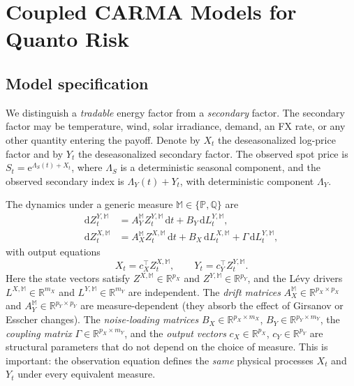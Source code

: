 \documentclass[10pt,a4paper,reqno]{amsart}
\newcommand{\R}{\mathbb{R}}
\newcommand{\Q}{\mathbb{Q}}
\newcommand{\PP}{\mathbb{P}}
\newcommand{\1}{\mathbbm{1}}
\newcommand{\dd}{\mathrm{d}}
\newcommand{\ee}{\mathrm{e}}
\begin{document}
\section{Coupled CARMA Models for Quanto Risk}\label{sec:coupled-carma-models}

\subsection{Model specification}

We distinguish a \emph{tradable} energy factor from a \emph{secondary} factor.
The secondary factor may be temperature, wind, solar irradiance, demand, an FX
rate, or any other quantity entering the payoff. Denote by \(X_t\) the
deseasonalized log-price factor and by \(Y_t\) the deseasonalized secondary
factor. The observed spot price is \(S_t = \ee^{\Lambda_S(t)+X_t}\), where
\(\Lambda_S\) is a deterministic seasonal component, and the observed secondary
index is \(\Lambda_Y(t)+Y_t\), with deterministic component \(\Lambda_Y\).

The dynamics under a generic measure \(\mathbb{M} \in \{\PP,\Q\}\) are
\begin{equation}\label{eq:coupled_model}
\begin{aligned}
  \dd Z_t^{Y,\mathbb{M}}
    &= A_Y^{\mathbb{M}} Z_t^{Y,\mathbb{M}}\,\dd t
       + B_Y\,\dd L_t^{Y,\mathbb{M}},\\
  \dd Z_t^{X,\mathbb{M}}
    &= A_X^{\mathbb{M}} Z_t^{X,\mathbb{M}}\,\dd t
       + B_X\,\dd L_t^{X,\mathbb{M}}
       + \Gamma\,\dd L_t^{Y,\mathbb{M}},
\end{aligned}
\end{equation}
with output equations
\begin{equation}\label{eq:outputs_coupled}
  X_t = c_X^\top Z_t^{X,\mathbb{M}},
  \qquad
  Y_t = c_Y^\top Z_t^{Y,\mathbb{M}}.
\end{equation}
Here the state vectors satisfy \(Z^{X,\mathbb{M}} \in \R^{p_X}\) and
\(Z^{Y,\mathbb{M}} \in \R^{p_Y}\), and the Lévy drivers \(L^{X,\mathbb{M}} \in
\R^{m_X}\) and \(L^{Y,\mathbb{M}} \in \R^{m_Y}\) are independent.
The \emph{drift matrices} \(A_X^{\mathbb{M}} \in \R^{p_X \times p_X}\) and
\(A_Y^{\mathbb{M}} \in \R^{p_Y \times p_Y}\) are measure-dependent (they absorb
the effect of Girsanov or Esscher changes). The \emph{noise-loading matrices}
\(B_X \in \R^{p_X \times m_X}\), \(B_Y \in \R^{p_Y \times m_Y}\), the
\emph{coupling matrix} \(\Gamma \in \R^{p_X \times m_Y}\), and the
\emph{output vectors} \(c_X \in \R^{p_X}\), \(c_Y \in \R^{p_Y}\) are
structural parameters that do not depend on the choice of measure. This is
important: the observation equation defines the \emph{same} physical
processes \(X_t\) and \(Y_t\) under every equivalent measure.
\end{document}
